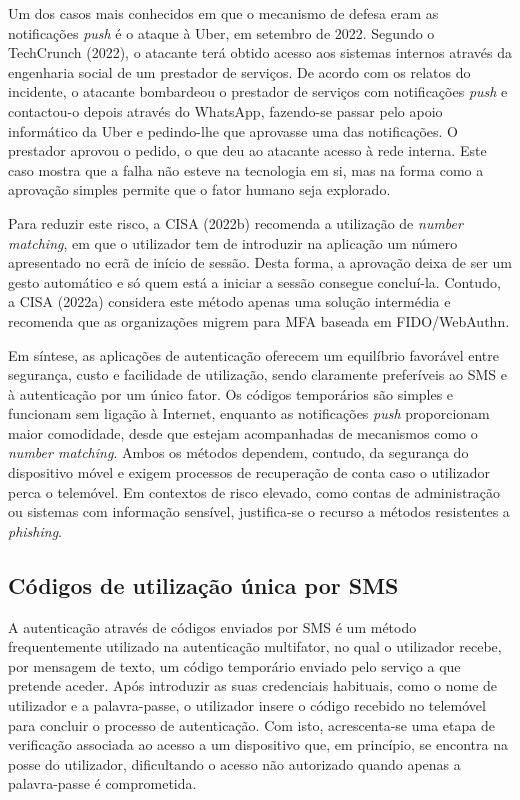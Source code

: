 \hspace{1cm} Um dos casos mais conhecidos em que o mecanismo de defesa eram as notificações \textit{push} é o ataque à Uber, em setembro de 2022. Segundo o TechCrunch (2022), o atacante terá obtido acesso aos sistemas internos através da engenharia social de um prestador de serviços. De acordo com os relatos do incidente, o atacante bombardeou o prestador de serviços com notificações \textit{push} e contactou-o depois através do WhatsApp, fazendo-se passar pelo apoio informático da Uber e pedindo-lhe que aprovasse uma das notificações. O prestador aprovou o pedido, o que deu ao atacante acesso à rede interna. Este caso mostra que a falha não esteve na tecnologia em si, mas na forma como a aprovação simples permite que o fator humano seja explorado.
 
\hspace{1cm} Para reduzir este risco, a CISA (2022b) recomenda a utilização de \textit{number matching}, em que o utilizador tem de introduzir na aplicação um número apresentado no ecrã de início de sessão. Desta forma, a aprovação deixa de ser um gesto automático e só quem está a iniciar a sessão consegue concluí-la. Contudo, a CISA (2022a) considera este método apenas uma solução intermédia e recomenda que as organizações migrem para MFA baseada em FIDO/WebAuthn.
 
\hspace{1cm} Em síntese, as aplicações de autenticação oferecem um equilíbrio favorável entre segurança, custo e facilidade de utilização, sendo claramente preferíveis ao SMS e à autenticação por um único fator. Os códigos temporários são simples e funcionam sem ligação à Internet, enquanto as notificações \textit{push} proporcionam maior comodidade, desde que estejam acompanhadas de mecanismos como o \textit{number matching}. Ambos os métodos dependem, contudo, da segurança do dispositivo móvel e exigem processos de recuperação de conta caso o utilizador perca o telemóvel. Em contextos de risco elevado, como contas de administração ou sistemas com informação sensível, justifica-se o recurso a métodos resistentes a \textit{phishing}.

\subsection{Códigos de utilização única por SMS}

\hspace{1cm} A autenticação através de códigos enviados por SMS é um método frequentemente utilizado na autenticação multifator, no qual o utilizador recebe, por mensagem de texto, um código temporário enviado pelo serviço a que pretende aceder. Após introduzir as suas credenciais habituais, como o nome de utilizador e a palavra-passe, o utilizador insere o código recebido no telemóvel para concluir o processo de autenticação. Com isto, acrescenta-se uma etapa de verificação associada ao acesso a um dispositivo que, em princípio, se encontra na posse do utilizador, dificultando o acesso não autorizado quando apenas a palavra-passe é comprometida.

